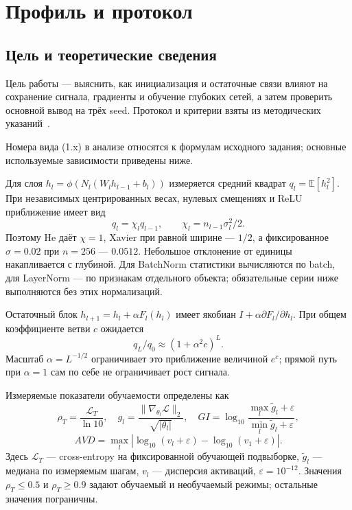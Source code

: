 \section{Профиль и протокол}

\subsection{Цель и теоретические сведения}
Цель работы --- выяснить, как инициализация и остаточные связи влияют на сохранение сигнала, градиенты и обучение глубоких сетей, а затем проверить основной вывод на трёх seed. Протокол и критерии взяты из методических указаний~\cite{teacher}.

Номера вида (1.x) в анализе относятся к формулам исходного задания; основные используемые зависимости приведены ниже.

Для слоя $h_l=\phi(N_l(W_lh_{l-1}+b_l))$ измеряется средний квадрат $q_l=\mathbb E[h_l^2]$. При независимых центрированных весах, нулевых смещениях и ReLU приближение имеет вид
\begin{equation}q_l=\chi_lq_{l-1},\qquad\chi_l=n_{l-1}\sigma_l^2/2.\end{equation}
Поэтому He даёт $\chi=1$, Xavier при равной ширине --- $1/2$, а фиксированное $\sigma=0.02$ при $n=256$ --- $0.0512$. Небольшое отклонение от единицы накапливается с глубиной. Для BatchNorm статистики вычисляются по batch, для LayerNorm --- по признакам отдельного объекта; обязательные серии ниже выполняются без этих нормализаций.

Остаточный блок $h_{l+1}=h_l+\alpha F_l(h_l)$ имеет якобиан $I+\alpha\partial F_l/\partial h_l$. При общем коэффициенте ветви $c$ ожидается
\begin{equation}q_L/q_0\approx(1+\alpha^2c)^L.\end{equation}
Масштаб $\alpha=L^{-1/2}$ ограничивает это приближение величиной $e^c$; прямой путь при $\alpha=1$ сам по себе не ограничивает рост сигнала.

Измеряемые показатели обучаемости определены как
\begin{equation}\rho_T=\frac{\mathcal L_T}{\ln10},\quad
g_l=\frac{\|\nabla_{\theta_l}\mathcal L\|_2}{\sqrt{|\theta_l|}},\quad
GI=\log_{10}\frac{\max_l\widetilde g_l+\varepsilon}{\min_l\widetilde g_l+\varepsilon},\end{equation}
\begin{equation}AVD=\max_l|\log_{10}(v_l+\varepsilon)-\log_{10}(v_1+\varepsilon)|.\end{equation}
Здесь $\mathcal L_T$ --- cross-entropy на фиксированной обучающей подвыборке, $\widetilde g_l$ --- медиана по измеряемым шагам, $v_l$ --- дисперсия активаций, $\varepsilon=10^{-12}$. Значения $\rho_T\le0.5$ и $\rho_T\ge0.9$ задают обучаемый и необучаемый режимы; остальные значения пограничны.

